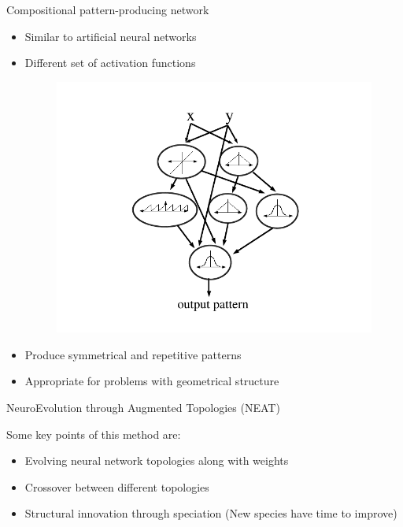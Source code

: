 \documentclass{beamer}
\begin{document}
\begin{frame}{Compositional pattern-producing network~\cite{stanley2007compositional}}
\begin{itemize}
\item Similar to artificial neural networks
\item Different set of activation functions
\begin{figure}
\begin{center}
\includegraphics[scale=0.25]{../Figures/Misc/cppnNetwork.png}
\end{center}
\end{figure}
\item Produce symmetrical and repetitive patterns
\item Appropriate for problems with geometrical structure
\end{itemize}
\end{frame}


\begin{frame}{NeuroEvolution through Augmented Topologies (NEAT)~\cite{stanley2002evolving}}
\begin{block}{Some key points of this method are:}
\begin{itemize}
\item Evolving neural network topologies along with weights
\item Crossover between different topologies
\item Structural innovation through speciation (New species have time to improve)
\end{itemize}
\end{block}
\end{frame}
\end{document}
